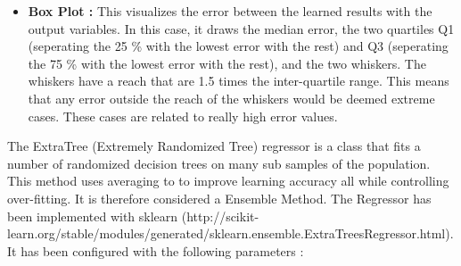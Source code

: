 \documentclass[a4paper,11pt]{report}
\numberwithin{figure}{section} %
\begin{document}
\begin{itemize}
\begin{itemize}
            \item \textbf{Box Plot :} This visualizes the error between the learned results with the output variables.
            In this case, it draws the median error, the two quartiles Q1 (seperating the 25 \% with the lowest error with the rest) and Q3 (seperating the 75 \% with the lowest error with the rest), and the two whiskers.
            The whiskers have a reach that are 1.5 times the inter-quartile range.
            This means that any error outside the reach of the whiskers would be deemed extreme cases.
            These cases are related to really high error values.
        \end{itemize}
    \end{itemize}

    The ExtraTree (Extremely Randomized Tree) regressor is a class that fits a number of randomized decision trees on many sub samples of the population.
    This method uses averaging to to improve learning accuracy all while controlling over-fitting.
    It is therefore considered a Ensemble Method.
    The Regressor has been implemented with sklearn (http://scikit-learn.org/stable/modules/generated/sklearn.ensemble.ExtraTreesRegressor.html).
    It has been configured with the following parameters :
\end{document}
